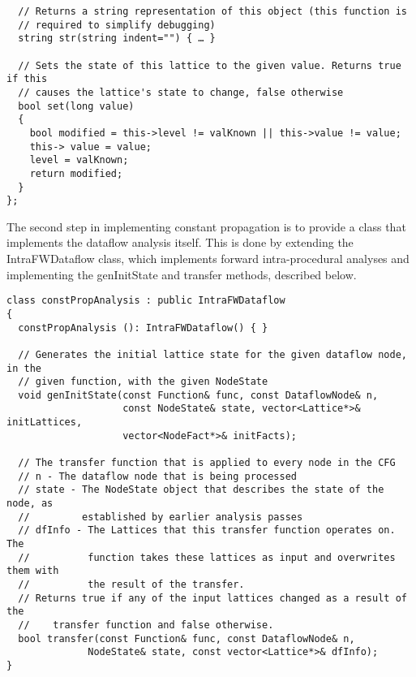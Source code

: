 {\begin{frame}
\begin{lstlisting}
  // Returns a string representation of this object (this function is 
  // required to simplify debugging)
  string str(string indent="") { … }

  // Sets the state of this lattice to the given value. Returns true if this 
  // causes the lattice's state to change, false otherwise
  bool set(long value)
  {
    bool modified = this->level != valKnown || this->value != value;
    this-> value = value;
    level = valKnown;
    return modified;
  }
}; 
\end{lstlisting}%
\label{unstruct-ex}
\end{frame}


The second step in implementing constant propagation is to provide a class that implements the dataflow analysis itself. This is done by extending the {\scriptsize IntraFWDataflow} class, which implements forward intra-procedural analyses and implementing the {\scriptsize genInitState} and {\scriptsize transfer} methods, described below.

\begin{frame}
\centering
\begin{lstlisting}
class constPropAnalysis : public IntraFWDataflow
{
  constPropAnalysis (): IntraFWDataflow() { }

  // Generates the initial lattice state for the given dataflow node, in the 
  // given function, with the given NodeState
  void genInitState(const Function& func, const DataflowNode& n, 
                    const NodeState& state, vector<Lattice*>& initLattices, 
                    vector<NodeFact*>& initFacts);

  // The transfer function that is applied to every node in the CFG
  // n - The dataflow node that is being processed
  // state - The NodeState object that describes the state of the node, as  
  //         established by earlier analysis passes
  // dfInfo - The Lattices that this transfer function operates on. The 
  //          function takes these lattices as input and overwrites them with 
  //          the result of the transfer.
  // Returns true if any of the input lattices changed as a result of the
  //    transfer function and false otherwise.
  bool transfer(const Function& func, const DataflowNode& n, 
              NodeState& state, const vector<Lattice*>& dfInfo);
}
\end{lstlisting}%
\end{frame}

}
